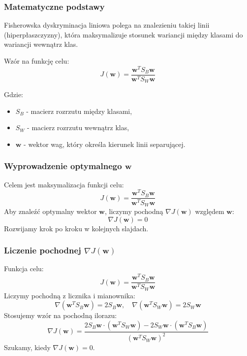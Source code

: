 \documentclass{beamer}
\begin{document}
\begin{frame}
    \frametitle{Matematyczne podstawy}
    Fisherowska dyskryminacja liniowa polega na znalezieniu takiej linii (hiperpłaszczyzny), która maksymalizuje stosunek wariancji między klasami do wariancji wewnątrz klas.
    
    Wzór na funkcję celu:
    \[
    J(\mathbf{w}) = \frac{\mathbf{w}^T S_B \mathbf{w}}{\mathbf{w}^T S_W \mathbf{w}}
    \]

    Gdzie:
    \begin{itemize}
        \item \( S_B \) - macierz rozrzutu między klasami,
        \item \( S_W \) - macierz rozrzutu wewnątrz klas,
        \item \( \mathbf{w} \) - wektor wag, który określa kierunek linii separującej.
    \end{itemize}
\end{frame}



\begin{frame}
    \frametitle{Wyprowadzenie optymalnego \(\mathbf{w}\)}
    Celem jest maksymalizacja funkcji celu:
    \[
    J(\mathbf{w}) = \frac{\mathbf{w}^T S_B \mathbf{w}}{\mathbf{w}^T S_W \mathbf{w}}
    \]
    Aby znaleźć optymalny wektor \(\mathbf{w}\), liczymy pochodną \(\nabla J(\mathbf{w})\) względem \(\mathbf{w}\):
    \[
    \nabla J(\mathbf{w}) = 0
    \]
    Rozwijamy krok po kroku w kolejnych slajdach.
\end{frame}

\begin{frame}
    \frametitle{Liczenie pochodnej \(\nabla J(\mathbf{w})\)}
    Funkcja celu:
    \[
    J(\mathbf{w}) = \frac{\mathbf{w}^T S_B \mathbf{w}}{\mathbf{w}^T S_W \mathbf{w}}
    \]
    Liczymy pochodną z licznika i mianownika:
    \[
    \nabla \left( \mathbf{w}^T S_B \mathbf{w} \right) = 2 S_B \mathbf{w}, \quad 
    \nabla \left( \mathbf{w}^T S_W \mathbf{w} \right) = 2 S_W \mathbf{w}
    \]
    Stosujemy wzór na pochodną ilorazu:
    \[
    \nabla J(\mathbf{w}) = \frac{2 S_B \mathbf{w} \cdot (\mathbf{w}^T S_W \mathbf{w}) - 2 S_W \mathbf{w} \cdot (\mathbf{w}^T S_B \mathbf{w})}{(\mathbf{w}^T S_W \mathbf{w})^2}
    \]
    Szukamy, kiedy \(\nabla J(\mathbf{w}) = 0\).
\end{frame}
\end{document}
